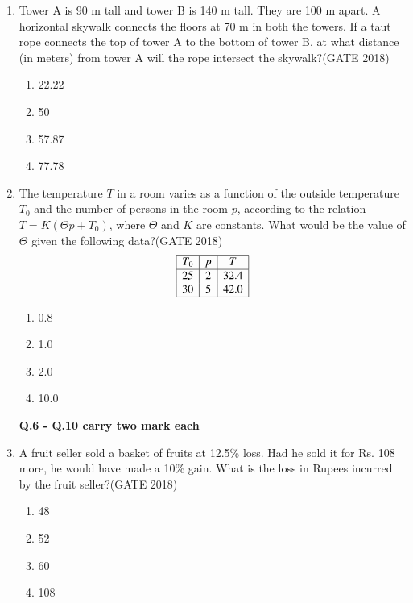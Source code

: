 \documentclass[journal,12pt,onecolumn]{IEEEtran}
\theoremstyle{remark}
\begin{document}
\begin{enumerate}
\item Tower A is 90 m tall and tower B is 140 m tall. They are 100 m apart. A horizontal skywalk connects the floors at 70 m in both the towers. If a taut rope connects the top of tower A to the bottom of tower B, at what distance (in meters) from tower A will the rope intersect the skywalk?\hfill{(GATE 2018)}
\begin{multicols}{4}
\begin{enumerate}
    \item 22.22
    \item 50
    \item 57.87
    \item 77.78
\end{enumerate}
\end{multicols}
\vspace{1cm}

\item The temperature $T$ in a room varies as a function of the outside temperature $T_0$ and the number of persons in the room $p$, according to the relation $T = K (\Theta p + T_0)$, where $\Theta$ and $K$ are constants. What would be the value of $\Theta$ given the following data?\hfill{(GATE 2018)}
\\
\[
\begin{array}{|c|c|c|}
\hline
T_0 & p & T \\
\hline
25 & 2 & 32.4 \\
30 & 5 & 42.0 \\
\hline
\end{array}
\]
\begin{multicols}{4}
\begin{enumerate}
    \item 0.8
    \item 1.0
    \item 2.0
    \item 10.0
\end{enumerate}
\end{multicols}
\vspace{1cm}
\newpage
\textbf{\large Q.6 - Q.10 carry two mark each}
\item A fruit seller sold a basket of fruits at 12.5\% loss. Had he sold it for Rs. 108 more, he would have made a 10\% gain. What is the loss in Rupees incurred by the fruit seller?\hfill{(GATE 2018)}
\begin{multicols}{4}
\begin{enumerate}
    \item 48
    \item 52
    \item 60
    \item 108
\end{enumerate}
\end{multicols}
\vspace{1cm}


\end{enumerate}
\end{document}
